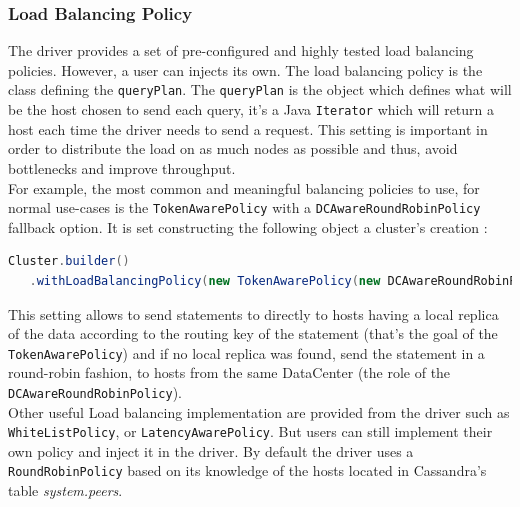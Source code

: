 \documentclass[a4paper]{report}
\begin{document}
\subsubsection{Load Balancing Policy}
The driver provides a set of pre-configured and highly tested load balancing policies. However, a user can injects its own. The load balancing policy is the class defining the \verb;queryPlan;. The \verb;queryPlan; is the object which defines what will be the host chosen to send each query, it's a Java \verb;Iterator; which will return a host each time the driver needs to send a request. This setting is important in order to distribute the load on as much nodes as possible and thus, avoid bottlenecks and improve throughput.\\
For example, the most common and meaningful balancing policies to use, for normal use-cases is the \verb;TokenAwarePolicy; with a \verb;DCAwareRoundRobinPolicy; fallback option. 
It is set constructing the following object a cluster's creation :
\begin{lstlisting}[label=lbp-ex-1, caption=Creation of the cluster, language=Java]
Cluster.builder()
   .withLoadBalancingPolicy(new TokenAwarePolicy(new DCAwareRoundRobinPolicy, true));
\end{lstlisting}
This setting allows to send statements to directly to hosts having a local replica of the data according to the routing key of the statement (that's the goal of the \verb;TokenAwarePolicy;) and if no local replica was found, send the statement in a round-robin fashion, to hosts from the same DataCenter (the role of the \verb;DCAwareRoundRobinPolicy;).\\
Other useful Load balancing implementation are provided from the driver such as \verb;WhiteListPolicy;, or \verb;LatencyAwarePolicy;. But users can still implement their own policy and inject it in the driver. By default the driver uses a \verb;RoundRobinPolicy; based on its knowledge of the hosts located in Cassandra's table \emph{system.peers}.
\end{document}
